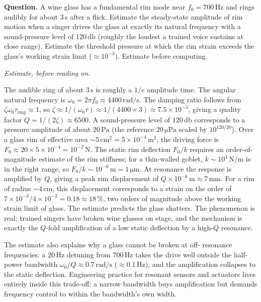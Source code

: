 \begin{estimation}
\textbf{Question.} A wine glass has a fundamental rim mode near
$f_{0} = 700\,\si{\hertz}$ and rings audibly for about
$3\,\si{\second}$ after a flick. Estimate the steady-state
amplitude of rim motion when a singer drives the glass at exactly
its natural frequency with a sound-pressure level of
$120\,\si{\decibel}$ (roughly the loudest a trained voice
sustains at close range). Estimate the threshold pressure at
which the rim strain exceeds the glass's working strain limit
($\approx 10^{-3}$). Estimate before computing.

\smallskip
\textit{Estimate, before reading on.}

\smallskip
The audible ring of about $3\,\si{\second}$ is roughly a $1/e$
amplitude time. The angular natural frequency is $\omega_{0} = 2
\pi f_{0} \approx 4400\,\si{\radian\per\second}$. The damping ratio
follows from $\zeta \omega_{0} \tau_{\text{ring}} \approx 1$, so
$\zeta \approx 1/(\omega_{0} \tau) \approx 1/(4400 \times 3)
\approx 7.5 \times 10^{-5}$, giving a quality factor $Q = 1/(2
\zeta) \approx 6500$. A sound-pressure level of $120\,\si{\decibel}$
corresponds to a pressure amplitude of about $20\,\si{\pascal}$
(the reference $20\,\si{\micro\pascal}$ scaled by $10^{120/20}$).
Over a glass rim of effective area $\sim 5\,\si{\centi\meter
\squared} = 5 \times 10^{-4}\,\si{\meter\squared}$, the driving
force is $F_{0} \approx 20 \times 5 \times 10^{-4} = 10^{-2}\,
\si{\newton}$. The static rim deflection $F_{0}/k$ requires an
order-of-magnitude estimate of the rim stiffness; for a thin-walled
goblet, $k \sim 10^{4}\,\si{\newton\per\meter}$ is in the right
range, so $F_{0}/k \sim 10^{-6}\,\si{\meter} = 1\,\si{\micro
\meter}$. At resonance the response is amplified by $Q$, giving a
peak rim displacement of $Q \times 10^{-6}\,\si{\meter} \approx 7
\,\si{\milli\meter}$. For a rim of radius $\sim 4\,\si{\centi
\meter}$, this displacement corresponds to a strain on the order
of $7 \times 10^{-3}/4 \times 10^{-2} = 0.18 \approx 18\,\%$,
two orders of magnitude above the working strain limit of glass.
The estimate predicts the glass shatters. The phenomenon is
real; trained singers have broken wine glasses on stage, and the
mechanism is exactly the $Q$-fold amplification of a low static
deflection by a high-$Q$ resonance.

The estimate also explains why a glass cannot be broken at off-
resonance frequencies: a $20\,\si{\hertz}$ detuning from
$700\,\si{\hertz}$ takes the drive well outside the half-power
bandwidth $\omega_{0}/Q \approx 0.7\,\si{\radian\per\second}$
($\approx 0.1\,\si{\hertz}$), and the amplification collapses to
the static deflection. Engineering practice for resonant
sensors and actuators lives entirely inside this trade-off: a
narrow bandwidth buys amplification but demands frequency
control to within the bandwidth's own width.
\end{estimation}

